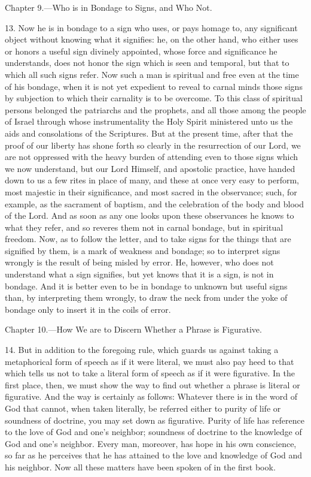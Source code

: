 
Chapter 9.—Who is in Bondage to Signs, and Who Not.

13. Now he is in bondage to a sign who uses, or pays homage to, any significant object without knowing what it signifies: he, on the other hand, who either uses or honors a useful sign divinely appointed, whose force and significance he understands, does not honor the sign which is seen and temporal, but that to which all such signs refer. Now such a man is spiritual and free even at the time of his bondage, when it is not yet expedient to reveal to carnal minds those signs by subjection to which their carnality is to be overcome. To this class of spiritual persons belonged the patriarchs and the prophets, and all those among the people of Israel through whose instrumentality the Holy Spirit ministered unto us the aids and consolations of the Scriptures. But at the present time, after that the proof of our liberty has shone forth so clearly in the resurrection of our Lord, we are not oppressed with the heavy burden of attending even to those signs which we now understand, but our Lord Himself, and apostolic practice, have handed down to us a few rites in place of many, and these at once very easy to perform, most majestic in their significance, and most sacred in the observance; such, for example, as the sacrament of baptism, and the celebration of the body and blood of the Lord. And as soon as any one looks upon these observances he knows to what they refer, and so reveres them not in carnal bondage, but in spiritual freedom. Now, as to follow the letter, and to take signs for the things that are signified by them, is a mark of weakness and bondage; so to interpret signs wrongly is the result of being misled by error. He, however, who does not understand what a sign signifies, but yet knows that it is a sign, is not in bondage. And it is better even to be in bondage to unknown but useful signs than, by interpreting them wrongly, to draw the neck from under the yoke of bondage only to insert it in the coils of error.


Chapter 10.—How We are to Discern Whether a Phrase is Figurative.

14. But in addition to the foregoing rule, which guards us against taking a metaphorical form of speech as if it were literal, we must also pay heed to that which tells us not to take a literal form of speech as if it were figurative. In the first place, then, we must show the way to find out whether a phrase is literal or figurative. And the way is certainly as follows: Whatever there is in the word of God that cannot, when taken literally, be referred either to purity of life or soundness of doctrine, you may set down as figurative. Purity of life has reference to the love of God  and one’s neighbor; soundness of doctrine to the knowledge of God and one’s neighbor. Every man, moreover, has hope in his own conscience, so far as he perceives that he has attained to the love and knowledge of God and his neighbor. Now all these matters have been spoken of in the first book.

